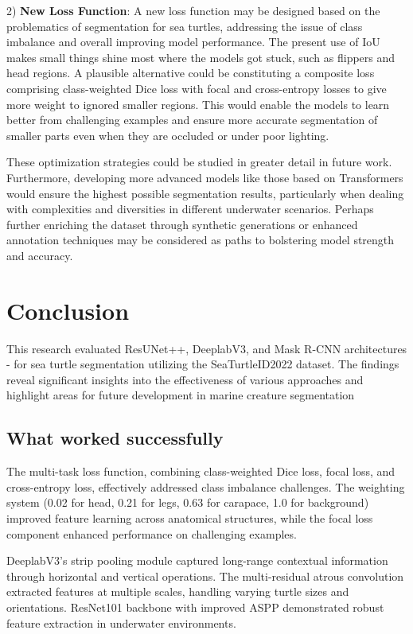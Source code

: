 \documentclass[conference]{IEEEtran}
\begin{document}
2) \textbf{New Loss Function}: A new loss function may be designed based on the problematics of segmentation for sea turtles, addressing the issue of class imbalance and overall improving model performance. The present use of IoU makes small things shine most where the models got stuck, such as flippers and head regions. A plausible alternative could be constituting a composite loss comprising class-weighted Dice loss with focal and cross-entropy losses to give more weight to ignored smaller regions. This would enable the models to learn better from challenging examples and ensure more accurate segmentation of smaller parts even when they are occluded or under poor lighting.

These optimization strategies could be studied in greater detail in future work. Furthermore, developing more advanced models like those based on Transformers would ensure the highest possible segmentation results, particularly when dealing with complexities and diversities in different underwater scenarios. Perhaps further enriching the dataset through synthetic generations or enhanced annotation techniques may be considered as paths to bolstering model strength and accuracy.
\section{Conclusion}
This research evaluated ResUNet++, DeeplabV3, and Mask R-CNN architectures - for sea turtle segmentation utilizing the SeaTurtleID2022 dataset. The findings reveal significant insights into the effectiveness of various approaches and highlight areas for future development in marine creature segmentation
\subsection{What worked successfully}
The multi-task loss function, combining class-weighted Dice loss, focal loss, and cross-entropy loss, effectively addressed class imbalance challenges. The weighting system (0.02 for head, 0.21 for legs, 0.63 for carapace, 1.0 for background) improved feature learning across anatomical structures, while the focal loss component enhanced performance on challenging examples.

DeeplabV3's strip pooling module captured long-range contextual information through horizontal and vertical operations. The multi-residual atrous convolution extracted features at multiple scales, handling varying turtle sizes and orientations. ResNet101 backbone with improved ASPP demonstrated robust feature extraction in underwater environments.
\end{document}
